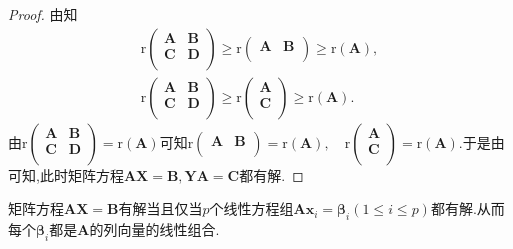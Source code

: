 \documentclass[../../main.tex]{subfiles}%
\begin{document}
\begin{proof}
由知
\begin{gather*}
\mathrm{r}\left( \begin{matrix}
\boldsymbol{A}&		\boldsymbol{B}\\
\boldsymbol{C}&		\boldsymbol{D}\\
\end{matrix} \right) \geqslant \mathrm{r}\left( \begin{matrix}
\boldsymbol{A}&		\boldsymbol{B}\\
\end{matrix} \right) \geqslant \mathrm{r}\left( \boldsymbol{A} \right) ,
\\
\mathrm{r}\left( \begin{matrix}
\boldsymbol{A}&		\boldsymbol{B}\\
\boldsymbol{C}&		\boldsymbol{D}\\
\end{matrix} \right) \geqslant \mathrm{r}\left( \begin{array}{c}
\boldsymbol{A}\\
\boldsymbol{C}\\
\end{array} \right) \geqslant \mathrm{r}\left( \boldsymbol{A} \right) .
\end{gather*}
由$\mathrm{r}\left( \begin{matrix}
\boldsymbol{A}&		\boldsymbol{B}\\
\boldsymbol{C}&		\boldsymbol{D}\\
\end{matrix} \right) =\mathrm{r}\left( \boldsymbol{A} \right)$可知$\mathrm{r}\left( \begin{matrix}
\boldsymbol{A}&		\boldsymbol{B}\\
\end{matrix} \right) =\mathrm{r}\left( \boldsymbol{A} \right) ,\quad \mathrm{r}\left( \begin{array}{c}
\boldsymbol{A}\\
\boldsymbol{C}\\
\end{array} \right) =\mathrm{r}\left( \boldsymbol{A} \right).$于是由可知,此时矩阵方程\(\boldsymbol{AX}=\boldsymbol{B},\boldsymbol{YA}=\boldsymbol{C}\)都有解.
\end{proof}

\begin{proposition}
矩阵方程\(\boldsymbol{A}\boldsymbol{X}=\boldsymbol{B}\)有解当且仅当\(p\)个线性方程组\(\boldsymbol{A}\boldsymbol{x}_i=\boldsymbol{\beta}_i(1\leqslant  i\leqslant  p)\)都有解.从而每个\(\boldsymbol{\beta}_i\)都是\(\boldsymbol{A}\)的列向量的线性组合.
\end{proposition}
\end{document}
